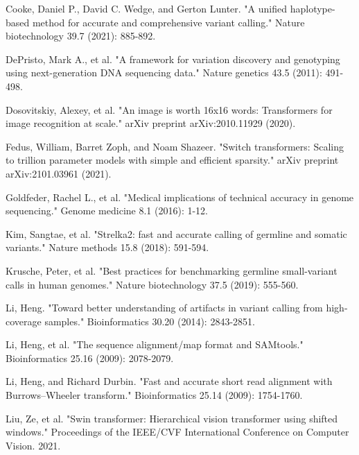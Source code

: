 \documentclass[]{article}
\begin{document}
\vspace{8pt}
Cooke, Daniel P., David C. Wedge, and Gerton Lunter. "A unified haplotype-based method for accurate and comprehensive variant calling." Nature biotechnology 39.7 (2021): 885-892.

\vspace{8pt}
DePristo, Mark A., et al. "A framework for variation discovery and genotyping using next-generation DNA sequencing data." Nature genetics 43.5 (2011): 491-498.
 
\vspace{8pt}
Dosovitskiy, Alexey, et al. "An image is worth 16x16 words: Transformers for image recognition at scale." arXiv preprint arXiv:2010.11929 (2020).

\vspace{8pt}
Fedus, William, Barret Zoph, and Noam Shazeer. "Switch transformers: Scaling to trillion parameter models with simple and efficient sparsity." arXiv preprint arXiv:2101.03961 (2021).


\vspace{8pt}
Goldfeder, Rachel L., et al. "Medical implications of technical accuracy in genome sequencing." Genome medicine 8.1 (2016): 1-12.

\vspace{8pt}
Kim, Sangtae, et al. "Strelka2: fast and accurate calling of germline and somatic variants." Nature methods 15.8 (2018): 591-594.

\vspace{8pt}
Krusche, Peter, et al. "Best practices for benchmarking germline small-variant calls in human genomes." Nature biotechnology 37.5 (2019): 555-560.

\vspace{8pt}
Li, Heng. "Toward better understanding of artifacts in variant calling from high-coverage samples." Bioinformatics 30.20 (2014): 2843-2851.

\vspace{8pt}
Li, Heng, et al. "The sequence alignment/map format and SAMtools." Bioinformatics 25.16 (2009): 
2078-2079.


\vspace{8pt}
Li, Heng, and Richard Durbin. "Fast and accurate short read alignment with Burrows–Wheeler transform." Bioinformatics 25.14 (2009): 1754-1760.

\vspace{8pt}
Liu, Ze, et al. "Swin transformer: Hierarchical vision transformer using shifted windows." Proceedings of the IEEE/CVF International Conference on Computer Vision. 2021.
\end{document}
